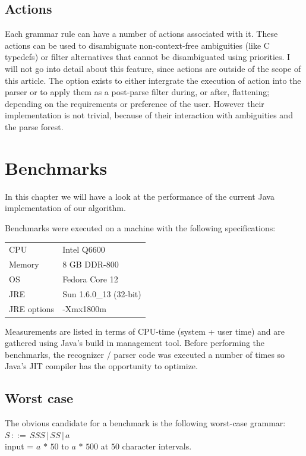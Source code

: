\documentclass[a4paper,10pt]{article}
\begin{document}
\subsection{Actions}

Each grammar rule can have a number of actions associated with it. These actions can be used to disambiguate non-context-free ambiguities (like C typedefs) or filter alternatives that cannot be disambiguated using priorities. I will not go into detail about this feature, since actions are outside of the scope of this article. The option exists to either intergrate the execution of action into the parser or to apply them as a post-parse filter during, or after, flattening; depending on the requirements or preference of the user. However their implementation is not trivial, because of their interaction with ambiguities and the parse forest.

\section{Benchmarks}

In this chapter we will have a look at the performance of the current Java implementation of our algorithm.

Benchmarks were executed on a machine with the following specifications:
\begin{table}[H]
\centering
\begin{tabular}{ | p{6em} | p{9em} | }
 \hline
 CPU & Intel Q6600 \\
 Memory & 8 GB DDR-800 \\
 OS & Fedora Core 12 \\
 JRE & Sun 1.6.0\_13 (32-bit) \\
 JRE options & -Xmx1800m \\
 \hline
\end{tabular}
\end{table}

Measurements are listed in terms of CPU-time (system + user time) and are gathered using Java's build in management tool. Before performing the benchmarks, the recognizer / parser code was executed a number of times so Java's JIT compiler has the opportunity to optimize.

\subsection{Worst case}

The obvious candidate for a benchmark is the following worst-case grammar:
$S\,::=\,SSS\,|\,SS\,|\,a$\\
input = $a\,*\,50$ to $a\,*\,500$ at $50$ character intervals.
\end{document}
